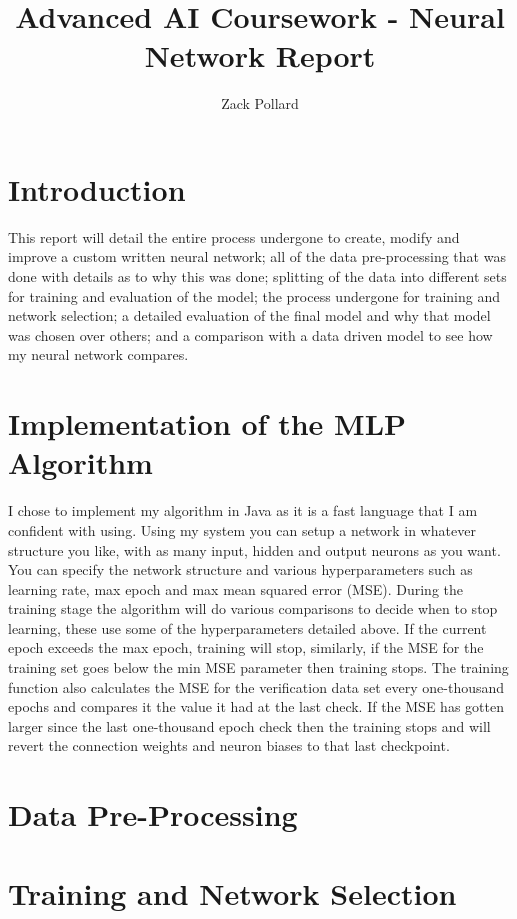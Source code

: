 \documentclass[10pt, a4paper]{article}
\begin{document}
\title{Advanced AI Coursework - Neural Network Report}
\author{Zack Pollard}
\maketitle

\tableofcontents

\newpage
\section{Introduction}
This report will detail the entire process undergone to create, modify and improve a custom written neural network; all of the data pre-processing that was done with details as to why this was done; splitting of the data into different sets for training and evaluation of the model; the process undergone for training and network selection; a detailed evaluation of the final model and why that model was chosen over others; and a comparison with a data driven model to see how my neural network compares.

\newpage
\section{Implementation of the MLP Algorithm}
I chose to implement my algorithm in Java as it is a fast language that I am confident with using. Using my system you can setup a network in whatever structure you like, with as many input, hidden and output neurons as you want. You can specify the network structure and various hyperparameters such as learning rate, max epoch and max mean squared error (MSE). During the training stage the algorithm will do various comparisons to decide when to stop learning, these use some of the hyperparameters detailed above. If the current epoch exceeds the max epoch, training will stop, similarly, if the MSE for the training set goes below the min MSE parameter then training stops. The training function also calculates the MSE for the verification data set every one-thousand epochs and compares it the value it had at the last check. If the MSE has gotten larger since the last one-thousand epoch check then the training stops and will revert the connection weights and neuron biases to that last checkpoint.

\newpage
\section{Data Pre-Processing}

\newpage
\section{Training and Network Selection}
\end{document}
